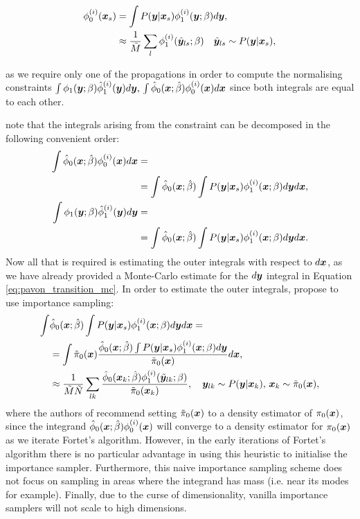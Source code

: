\documentclass[a4paper,12pt,twoside,openright]{report}
\theoremstyle{definition}
\begin{document}
\begin{align}\label{eq:pavon_transition_mc}
    \phi_0^{(i)}({\bm{x}}_s) &= \int P({\bm{y}}| {\bm{x}}_s) \phi_1^{(i)}({\bm{y}}; \beta) d{\bm{y}}, \nonumber \\
    &\approx \frac{1}{\tilde{M}} \sum_l \phi_1^{(i)}(\tilde{{\bm{y}}}_{ls}; \beta) \quad \tilde{{\bm{y}}}_{ls} \sim   P({\bm{y}}| {\bm{x}}_s),
\end{align}

as we require only one of the propagations in order to compute the normalising constraints  $\int \phi_1({\bm{y}}; {\beta} )   {\hat{\phi}}_1^{(i)}({\bm{y}}) d{\bm{y}} , \, \int {\hat{\phi}}_0({\bm{x}}; \hat{\beta} )   \phi_0^{(i)}({\bm{x}}) d{\bm{x}} $ since both integrals are equal to each other.

\cite{pavon2018data} note that the integrals arising from the constraint can be decomposed in the following convenient order:
\begin{align}
\int {\hat{\phi}}_0({\bm{x}}; \hat{\beta} )   \phi_0^{(i)}({\bm{x}}) d{\bm{x}} &=\nonumber\\
& = \int  {\hat{\phi}}_0({\bm{x}}; \hat{\beta} ) \int P({\bm{y}}| {\bm{x}}_s) \phi_1^{(i)}({\bm{x}}; \beta) d{\bm{y}} d{\bm{x}}, \\
    \int \phi_1({\bm{y}}; {\beta} )   {\hat{\phi}}_1^{(i)}({\bm{y}}) d{\bm{y}} &=\nonumber\\
    &=\int  {\hat{\phi}}_0({\bm{x}}; \hat{\beta} ) \int P({\bm{y}}| {\bm{x}}_s) \phi_1^{(i)}({\bm{x}}; \beta) d{\bm{y}} d{\bm{x}}.
\end{align}
Now all that is required is estimating the outer integrals with respect to $d{\bm{x}}$, as we have already provided a Monte-Carlo estimate for the $d{\bm{y}}$ integral in Equation \ref{eq:pavon_transition_mc}. In order to estimate the outer integrals,  \cite{pavon2018data} propose to use importance sampling:
\begin{align}
    \int&  {\hat{\phi}}_0({\bm{x}}; \hat{\beta} ) \int P({\bm{y}}| {\bm{x}}_s) \phi_1^{(i)}({\bm{x}}; \beta) d{\bm{y}} d{\bm{x}} = \nonumber \\
    & = \int \tilde{\pi}_0({\bm{x}}) \frac{{\hat{\phi}}_0({\bm{x}}; \hat{\beta} ) \int P({\bm{y}}| {\bm{x}}_s) \phi_1^{(i)}({\bm{x}}; \beta) d{\bm{y}}}{\tilde{\pi}_0({\bm{x}})} d{\bm{x}}, \nonumber \\ 
     &\approx  \frac{1}{\tilde{M}\tilde{N}}\sum_{lk} \frac{{\hat{\phi}}_0({\bm{x}}_k; \hat{\beta} )\phi_1^{(i)}(\tilde{{\bm{y}}}_{lk}; \beta) }{\tilde{\pi}_0({\bm{x}}_k)} ,  \quad {\bm{y}}_{lk} \sim   P({\bm{y}}| {\bm{x}}_k), \, {\bm{x}}_k\sim\tilde{\pi}_0({\bm{x}}),
\end{align}
where the authors of \cite{pavon2018data} recommend  setting  $\tilde{\pi}_0({\bm{x}})$ to a density estimator of $\pi_0({\bm{x}})$, since the integrand  ${\hat{\phi}}_0({\bm{x}}; \hat{\beta} )\phi_0^{(i)}({\bm{x}})$ will converge  to a density estimator for $\pi_0({\bm{x}})$ as we iterate Fortet's algorithm. However, in the early iterations of Fortet's algorithm there is no particular advantage in using this heuristic to initialise the importance sampler. Furthermore, this naive importance sampling scheme does not focus on sampling in areas where the integrand has mass (i.e. near its modes for example). Finally, due to the curse of dimensionality, vanilla importance samplers will not scale to high dimensions.
\end{document}
